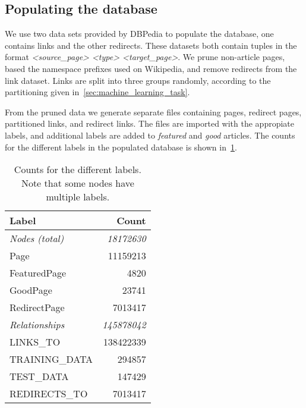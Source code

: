 \subsection{Populating the database} \label{sec:db_populate}
We use two data sets provided by DBPedia to populate the database, one contains links and the other redirects. These datasets both contain tuples in the format \emph{<source\_page> <type> <target\_page>}.  We prune non-article pages, based the namespace prefixes used on Wikipedia, and remove redirects from the link dataset. Links are split into three groups randomly, according to the partitioning given in~\cref{sec:machine_learning_task}. 

From the pruned data we generate separate files containing pages, redirect pages, partitioned links, and redirect links. The files are imported with the appropiate labels, and additional labels are added to \emph{featured} and \emph{good} articles.
 The counts for the different labels in the populated database is shown in~\cref{tab:db_counts}.

\begin{table}[tbp]
\centering
\begin{tabular}{@{}lr@{}}
\toprule
\textbf{Label}         & \textbf{Count}     \\ \midrule
\textit{Nodes (total)} & \textit{18172630}  \\
Page                   & 11159213           \\
FeaturedPage           & 4820               \\
GoodPage               & 23741              \\
RedirectPage           & 7013417            \\ \midrule
\textit{Relationships} & \textit{145878042} \\
LINKS\_TO              & 138422339          \\
TRAINING\_DATA         & 294857             \\
TEST\_DATA             & 147429             \\
REDIRECTS\_TO          & 7013417            \\ \bottomrule
\end{tabular}
\caption{Counts for the different labels. Note that some nodes have multiple labels.}
\label{tab:db_counts}
\end{table}
